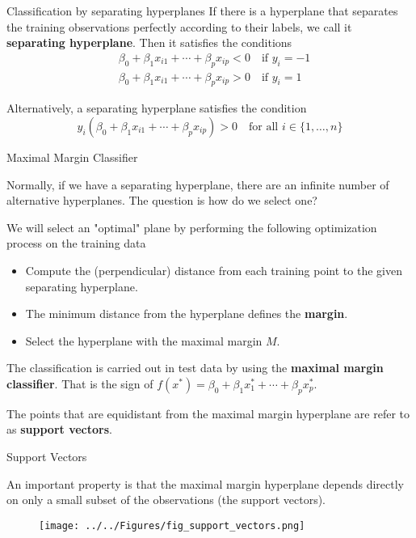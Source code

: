 \documentclass{beamer}
\begin{document}
\begin{frame}{Classification by separating hyperplanes}
	If there is a hyperplane that separates the training observations perfectly according to their labels, we call it {\bf separating hyperplane}.  Then it satisfies the conditions
	\begin{equation*}
		\begin{split}
			&\beta_0 + \beta_1 x_{i1} + \cdots + \beta_p x_{ip}<0  \quad \textrm{if } y_i = -1\\
			&\beta_0 + \beta_1 x_{i1}+ \cdots + \beta_p x_{ip}>0  \quad \textrm{if } y_i =1
		\end{split}
	\end{equation*}

Alternatively, a separating hyperplane satisfies the condition
\begin{equation*}
	y_i \left( \beta_0 + \beta_1 x_{i1} + \cdots + \beta_p x_{ip} \right)  >0  \quad \textrm{for all  } i \in \{1,\ldots,n\}
\end{equation*}
\end{frame}

\begin{frame}{Maximal Margin Classifier}
	
	Normally, if we have a separating hyperplane, there are an infinite number of alternative hyperplanes. The question is how do we select one?
	
	We will select an "optimal" plane by performing the following optimization process on the training data
	
	\begin{itemize}
		\item Compute the (perpendicular) distance from each training point to the given separating hyperplane.
		\item The minimum distance from the hyperplane defines the {\bf margin}.
		\item Select the hyperplane with the maximal margin $M$.
	\end{itemize}
	The classification is carried out in test data by using the {\bf maximal margin classifier}. That is the sign of $f(x^*)= \beta_0 + \beta_1 x_1^* + \cdots + \beta_p x_p^*$. 
	
	The points that are equidistant from the maximal margin hyperplane are refer to as {\bf support vectors}. 
\end{frame}

\begin{frame}{Support Vectors}
	
	An important property is that the maximal margin hyperplane depends directly on only a small subset of the observations (the support vectors).
	
		\begin{figure}[h]
		\centering
		\texttt{[image: ../../Figures/fig\_support\_vectors.png]}
	\end{figure}	
\end{frame}
\end{document}
